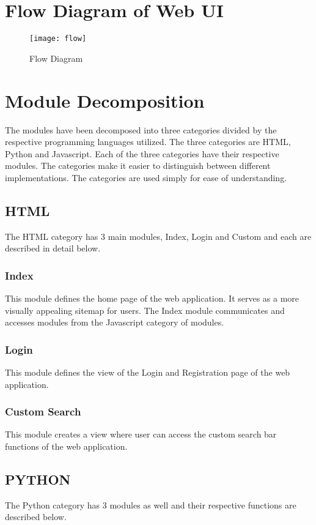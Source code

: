 \documentclass[12pt, titlepage]{article}
\begin{document}
\section{Flow Diagram of Web UI}
\begin{figure}[!htb]
\centering
\texttt{[image: flow]}
\caption{Flow Diagram}
\label{fig:Flow}
\end{figure}


\section{Module Decomposition}
The modules have been decomposed into three categories divided by the respective programming languages utilized. The three categories are HTML, Python and Javascript. Each of the three categories have their respective modules. The categories make it easier to distinguish between different implementations. The categories are used simply for ease of understanding. 

\subsection{HTML}
The HTML category has 3 main modules, Index, Login and Custom and each are described in detail below. 
\subsubsection{Index}
This module defines the home page of the web application. It serves as a more visually appealing sitemap for users. The Index module communicates and accesses modules from the Javascript category of modules. 

\subsubsection{Login}
This module defines the view of the Login and Registration page of the web application. 

\subsubsection{Custom Search}
This module creates a view where user can access the custom search bar functions of the web application. 

\subsection{PYTHON}
The Python category has 3 modules as well and their respective functions are described below.
\end{document}
